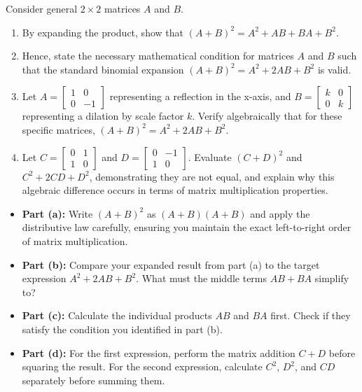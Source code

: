 \begin{problem}
Consider general $2 \times 2$ matrices $A$ and $B$.

\begin{enumerate}[label=\textbf{(\alph*)}]
    \item By expanding the product, show that $(A+B)^2 = A^2 + AB + BA + B^2$.
    \item Hence, state the necessary mathematical condition for matrices $A$ and $B$ such that the standard binomial expansion $(A+B)^2 = A^2 + 2AB + B^2$ is valid.
    \item Let $A = \begin{bmatrix} 1 & 0 \\ 0 & -1 \end{bmatrix}$ representing a reflection in the x-axis, and $B = \begin{bmatrix} k & 0 \\ 0 & k \end{bmatrix}$ representing a dilation by scale factor $k$. Verify algebraically that for these specific matrices, $(A+B)^2 = A^2 + 2AB + B^2$.
    \item Let $C = \begin{bmatrix} 0 & 1 \\ 1 & 0 \end{bmatrix}$ and $D = \begin{bmatrix} 0 & -1 \\ 1 & 0 \end{bmatrix}$. Evaluate $(C+D)^2$ and $C^2 + 2CD + D^2$, demonstrating they are not equal, and explain why this algebraic difference occurs in terms of matrix multiplication properties.
\end{enumerate}
\end{problem}

\begin{hint}
\begin{itemize}
    \item \textbf{Part (a):} Write $(A+B)^2$ as $(A+B)(A+B)$ and apply the distributive law carefully, ensuring you maintain the exact left-to-right order of matrix multiplication.
    \item \textbf{Part (b):} Compare your expanded result from part (a) to the target expression $A^2 + 2AB + B^2$. What must the middle terms $AB + BA$ simplify to?
    \item \textbf{Part (c):} Calculate the individual products $AB$ and $BA$ first. Check if they satisfy the condition you identified in part (b).
    \item \textbf{Part (d):} For the first expression, perform the matrix addition $C+D$ before squaring the result. For the second expression, calculate $C^2$, $D^2$, and $CD$ separately before summing them.
\end{itemize}
\end{hint}

